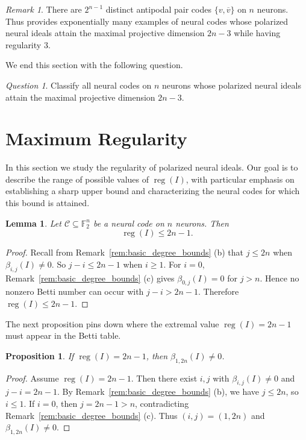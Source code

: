 \documentclass[12pt]{amsart}
\newtheorem{lemma}[theorem]{Lemma}
\newtheorem{proposition}[theorem]{Proposition}
\theoremstyle{remark}
\newtheorem{remark}[theorem]{Remark}
\newtheorem{question}[theorem]{Question}
\theoremstyle{definition}
\DeclareMathOperator{\reg}{reg}
\newcommand{\F}{\mathbb{F}}
\newcommand{\C}{\mathcal{C}}
\begin{document}
\begin{remark}\label{rem:many_antipodal_examples}
There are $2^{n-1}$ distinct antipodal pair codes $\{v,\overline v\}$ on $n$ neurons.
Thus  provides exponentially many examples of neural codes
whose polarized neural ideals attain the maximal projective dimension $2n-3$ while having regularity $3$.
\end{remark}


We end this section with the following question.


\begin{question}\label{q:classify_maxpdim}
Classify all neural codes on $n$ neurons whose polarized neural ideals attain the maximal projective dimension $2n-3$.
\end{question}
\section{Maximum Regularity}\label{sec:regularity}

In this section we study the regularity of polarized neural ideals. Our goal is to describe the range of possible values of  $\reg(I)$, with particular emphasis on establishing a sharp upper bound and characterizing the neural codes for which this bound is attained.


\begin{lemma}\label{lem:reg_upper_bound}
Let \(\C \subseteq \F_2^n\) be a neural code on \(n\) neurons.
Then
\[
\reg(I)\le 2n-1.
\]
\end{lemma}


\begin{proof}
Recall from Remark~\ref{rem:basic_degree_bounds} (b) that  \(j\le 2n\) when \(\beta_{i,j}(I)\neq 0\). So \(j-i\le 2n-1\)  when $i\geq 1$.
For \(i=0\), Remark~\ref{rem:basic_degree_bounds} (c) gives \(\beta_{0,j}(I)=0\) for \(j>n\).
Hence no nonzero Betti number can occur with \(j-i>2n-1\). Therefore \(\reg(I)\le 2n-1\).
\end{proof}



The next proposition pins down where the extremal value \(\reg(I)=2n-1\) must appear in the Betti table.

\begin{proposition}\label{prop:regmax_beta12n}
If \(\reg(I)=2n-1\), then \(\beta_{1,2n}(I)\neq 0\).
\end{proposition}

\begin{proof}
Assume \(\reg(I)=2n-1\). Then there exist \(i,j\) with \(\beta_{i,j}(I)\neq 0\) and \(j-i=2n-1\).
By Remark~\ref{rem:basic_degree_bounds} (b), we have \(j\le 2n\), so \(i\le 1\).
If \(i=0\), then \(j=2n-1>n\), contradicting Remark~\ref{rem:basic_degree_bounds} (c).
Thus \((i,j)=(1,2n)\) and \(\beta_{1,2n}(I)\neq 0\).
\end{proof}
\end{document}

